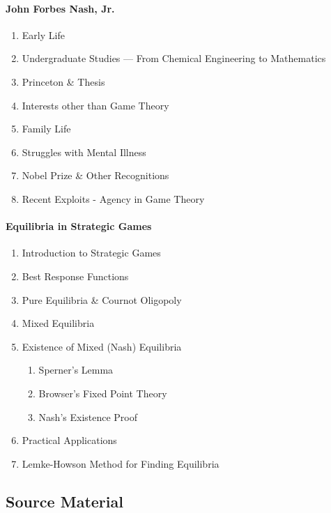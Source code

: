 \documentclass[11pt]{article}
\begin{document}
\paragraph{John Forbes Nash, Jr.}
\begin{enumerate}
	\item Early Life
	\item Undergraduate Studies ---  From Chemical Engineering to Mathematics
	\item Princeton \& Thesis
	\item Interests other than Game Theory
	\item Family Life
	\item Struggles with Mental Illness
	\item Nobel Prize \& Other Recognitions
	\item Recent Exploits - Agency in Game Theory
\end{enumerate}

\newpage
\paragraph{Equilibria in Strategic Games}
\begin{enumerate}
	\item Introduction to Strategic Games
	\item Best Response Functions
	\item Pure Equilibria \& Cournot Oligopoly
	\item Mixed Equilibria
	\item Existence of Mixed (Nash) Equilibria
	\begin{enumerate}
		\item Sperner's Lemma
		\item Browser's Fixed Point Theory
		\item Nash's Existence Proof
	\end{enumerate}
	\item Practical Applications
	\item Lemke-Howson Method for Finding Equilibria
\end{enumerate}


\subsection*{Source Material}

\end{document}
